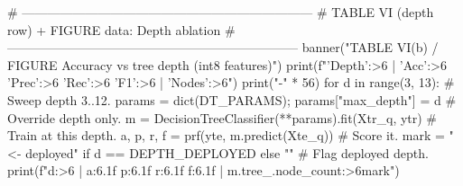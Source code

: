     # ---------------------------------------------------------------------
    # TABLE VI (depth row) + FIGURE data: Depth ablation
    # ---------------------------------------------------------------------
    banner("TABLE VI(b) / FIGURE  Accuracy vs tree depth (int8 features)")
    print(f"{'Depth':>6} | {'Acc':>6} {'Prec':>6} {'Rec':>6} {'F1':>6} | {'Nodes':>6}")
    print("-" * 56)
    for d in range(3, 13):                              # Sweep depth 3..12.
        params = dict(DT_PARAMS); params["max_depth"] = d  # Override depth only.
        m = DecisionTreeClassifier(**params).fit(Xtr_q, ytr)  # Train at this depth.
        a, p, r, f = prf(yte, m.predict(Xte_q))        # Score it.
        mark = "  <- deployed" if d == DEPTH_DEPLOYED else ""  # Flag deployed depth.
        print(f"{d:>6} | {a:6.1f} {p:6.1f} {r:6.1f} {f:6.1f} | {m.tree_.node_count:>6}{mark}")

